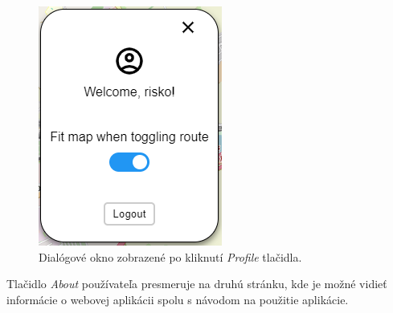 \begin{figure}[H]
  \centering
  \includegraphics[width=0.2 \textwidth]{img/tools-panel/profile-dialog.png}
  \caption{Dialógové okno zobrazené po kliknutí \textit{Profile} tlačidla.}
  \label{fig:profile_dialog}
\end{figure}

Tlačidlo \textit{About} používateľa presmeruje na druhú stránku, kde je možné vidieť informácie o webovej aplikácii spolu s návodom na použitie aplikácie.


